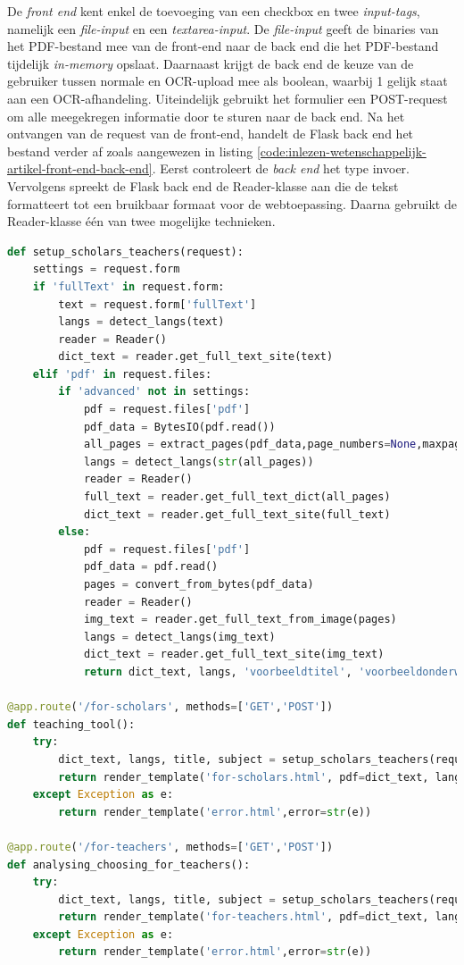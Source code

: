 \medspace

De \textit{front end} kent enkel de toevoeging van een checkbox en twee \textit{input-tags}, namelijk een \textit{file-input} en een \textit{textarea-input}. De \textit{file-input} geeft de binaries van het PDF-bestand mee van de front-end naar de back end die het PDF-bestand tijdelijk \textit{in-memory} opslaat. Daarnaast krijgt de back end de keuze van de gebruiker tussen normale en OCR-upload mee als boolean, waarbij 1 gelijk staat aan een OCR-afhandeling. Uiteindelijk gebruikt het formulier een POST-request om alle meegekregen informatie door te sturen naar de back end. Na het ontvangen van de request van de front-end, handelt de Flask back end het bestand verder af zoals aangewezen in listing \ref{code:inlezen-wetenschappelijk-artikel-front-end-back-end}. Eerst controleert de \textit{back end} het type invoer. Vervolgens spreekt de Flask back end de Reader-klasse aan die de tekst formatteert tot een bruikbaar formaat voor de webtoepassing. Daarna gebruikt de Reader-klasse één van twee mogelijke technieken. 

\begin{lstlisting}[language=Python, caption={Koppeling tussen front-end en back-end voor het inlezen van een wetenschappelijk artikel}, label={code:inlezen-wetenschappelijk-artikel-front-end-back-end}]
def setup_scholars_teachers(request):
	settings = request.form
	if 'fullText' in request.form:
		text = request.form['fullText']
		langs = detect_langs(text)
		reader = Reader()
		dict_text = reader.get_full_text_site(text)                
	elif 'pdf' in request.files:
		if 'advanced' not in settings:
			pdf = request.files['pdf']
			pdf_data = BytesIO(pdf.read())
			all_pages = extract_pages(pdf_data,page_numbers=None,maxpages=999)
			langs = detect_langs(str(all_pages))
			reader = Reader()
			full_text = reader.get_full_text_dict(all_pages)
			dict_text = reader.get_full_text_site(full_text)
		else:
			pdf = request.files['pdf']
			pdf_data = pdf.read()
			pages = convert_from_bytes(pdf_data)
			reader = Reader()
			img_text = reader.get_full_text_from_image(pages)
			langs = detect_langs(img_text)
			dict_text = reader.get_full_text_site(img_text)                            
			return dict_text, langs, 'voorbeeldtitel', 'voorbeeldonderwerp'
			
@app.route('/for-scholars', methods=['GET','POST'])
def teaching_tool():
	try:
		dict_text, langs, title, subject = setup_scholars_teachers(request)
		return render_template('for-scholars.html', pdf=dict_text, lang=langs, title=title, subject=subject)
	except Exception as e:
		return render_template('error.html',error=str(e))
	
@app.route('/for-teachers', methods=['GET','POST'])
def analysing_choosing_for_teachers():
	try:
		dict_text, langs, title, subject = setup_scholars_teachers(request)
		return render_template('for-teachers.html', pdf=dict_text, lang=langs, title=title, subject=subject)
	except Exception as e:
		return render_template('error.html',error=str(e))
\end{lstlisting}

